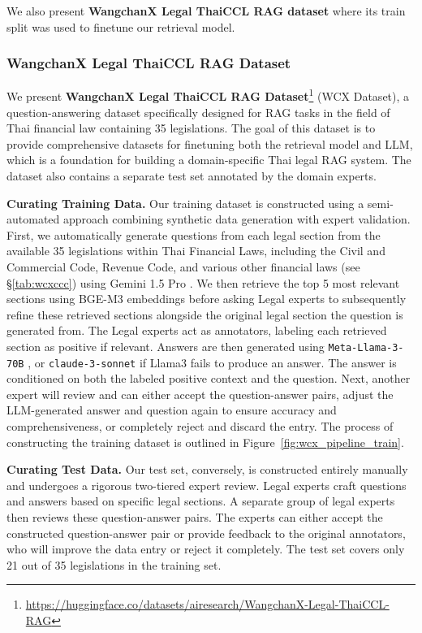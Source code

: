 We also present \textbf{WangchanX Legal ThaiCCL RAG dataset} where its train split was used to finetune our retrieval model.

\subsubsection{WangchanX Legal ThaiCCL RAG Dataset}
\label{subsubsec: wcx_dataset}

We present \textbf{WangchanX Legal ThaiCCL RAG Dataset}\footnote{\url{https://huggingface.co/datasets/airesearch/WangchanX-Legal-ThaiCCL-RAG}} (WCX Dataset), a question-answering dataset specifically designed for RAG tasks in the field of Thai financial law containing 35 legislations. 
%
The goal of this dataset is to provide comprehensive datasets for finetuning both the retrieval model and LLM, which is a foundation for building a domain-specific Thai legal RAG system. 
%
The dataset also contains a separate test set annotated by the domain experts.

\textbf{Curating Training Data.} Our training dataset is constructed using a semi-automated approach combining synthetic data generation with expert validation. 
%
First, we automatically generate questions from each legal section from the available 35 legislations within Thai Financial Laws, including the Civil and Commercial Code, Revenue Code, and various other financial laws (see \S\ref{tab:wcxccc}) using Gemini 1.5 Pro \cite{gemini1.5}. 
%
We then retrieve the top 5 most relevant sections using BGE-M3 embeddings \cite{bge-m3} before asking Legal experts to subsequently refine these retrieved sections alongside the original legal section the question is generated from. 
%
The Legal experts act as annotators, labeling each retrieved section as positive if relevant. Answers are then generated using \texttt{Meta-Llama-3-70B} \cite{llama3.1}, or \texttt{claude-3-sonnet} \cite{claude3} if Llama3 fails to produce an answer. 
%
The answer is conditioned on both the labeled positive context and the question. 
%
Next, another expert will review and can either accept the question-answer pairs, adjust the LLM-generated answer and question again to ensure accuracy and comprehensiveness, or completely reject and discard the entry.
%
The process of constructing the training dataset is outlined in Figure~\ref{fig:wcx_pipeline_train}.

\textbf{Curating Test Data.} 
%
Our test set, conversely, is constructed entirely manually and undergoes a rigorous two-tiered expert review. 
%
Legal experts craft questions and answers based on specific legal sections. 
%
A separate group of legal experts then reviews these question-answer pairs. 
%
The experts can either accept the constructed question-answer pair or provide feedback to the original annotators, who will improve the data entry or reject it completely.
%
The test set covers only 21 out of 35 legislations in the training set.

